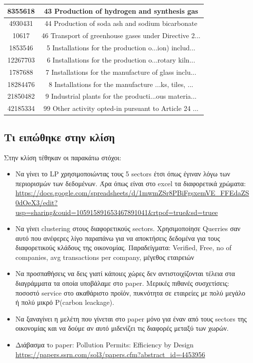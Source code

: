 \documentclass[a4paper,twoside,10pt]{article}
\begin{document}
\begin{tabular}{|c|c|}
	\hline
	8355618 & 43 Production of hydrogen and synthesis gas \\
	\hline
	4930431 & 44 Production of soda ash and sodium bicarbonate \\
	\hline
	10617 & 46 Transport of greenhouse gases under Directive 2... \\
	\hline
	1853546 & 5 Installations for the production o...ion) includ... \\
	\hline
	12267703 & 6 Installations for the production o...rotary kiln... \\
	\hline
	1787688 & 7 Installations for the manufacture of glass inclu... \\
	\hline
	18284476 & 8 Installations for the manufacture ...ks, tiles, ... \\
	\hline
	21850482 & 9 Industrial plants for the producti...ous materia... \\
	\hline
	42185334 & 99 Other activity opted-in pursuant to Article 24 ... \\
	\hline
\end{tabular}

\subsection{Τι ειπώθηκε στην κλίση}
Στην κλίση τέθηκαν οι παρακάτω στόχοι:
\begin{itemize}
	\item Να γίνει το LP χρησιμοποιώντας τους 5 sectors έτσι όπως έγιναν λόγω των περιορισμών των δεδομένων. Άρα όπως είναι στο excel τα διαφορετικά χρώματα:  \url{https://docs.google.com/spreadsheets/d/1mwmZSr8PBiFgsxemVE_FFEdaZS0dOeX3/edit?usp=sharing&ouid=105915891653467891041&rtpof=true&sd=truee}
	\item Να γίνει clustering  στους διαφορετικούς sectors. Χρησιμοποίησε Querries σαν αυτό που ανέφερες λίγο παραπάνω για να αποκτήσεις δεδομένα για τους διαφορετικούς κλάδους της οικονομίας. Παραδείγματα: Verified, Free, no of companies, avg transactions per company, μέγεθος εταιρειών 
	\item Να προσπαθήσεις να δεις γιατί κάποιες χώρες δεν αντιστοιχίζονται τέλεια στα διαγράμματα τα οποία υποβάλαμε στο paper. Μερικές πιθανές συσχετίσεις: ποσοστό service στο ακαθάριστο προϊόν, πυκνότητα σε εταιρείες με πολύ μεγάλο ή πολύ μικρό P(carbon leackage). 
	\item Να ξαναγίνει η μελέτη που γίνεται στο paper μόνο για έναν από τους sectors της οικονομίας και να δούμε αν αυτό μιδενίζει τις διαφορές μεταξύ των χωρών. 
	\item Διάβασμα τo paper: Pollution Permits: Efficiency by Design \url{https://papers.ssrn.com/sol3/papers.cfm?abstract_id=4453956}
\end{itemize}
\end{document}
